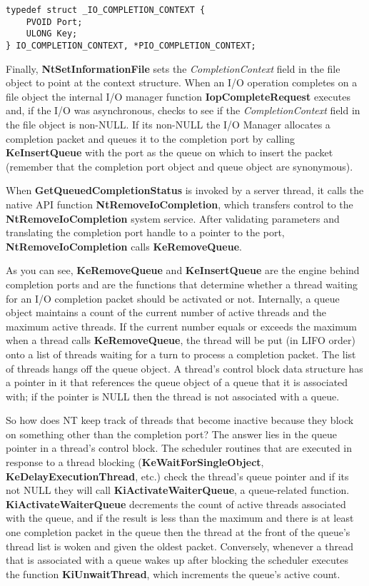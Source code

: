 \documentclass[a4paper,12pt,notitlepage,twoside,openright]{article}
\begin{document}
\begin{verbatim}
typedef struct _IO_COMPLETION_CONTEXT {
    PVOID Port;
    ULONG Key;
} IO_COMPLETION_CONTEXT, *PIO_COMPLETION_CONTEXT;
\end{verbatim}

Finally, \textbf{NtSetInformationFile} sets the \emph{CompletionContext} field in the file object to point at the context structure. When an I/O operation completes on a file object the internal I/O manager function \textbf{IopCompleteRequest} executes and, if the I/O was asynchronous, checks to see if the \emph{CompletionContext} field in the file object is non-NULL. If its non-NULL the I/O Manager allocates a completion packet and queues it to the completion port by calling \textbf{KeInsertQueue} with the port as the queue on which to insert the packet (remember that the completion port object and queue object are synonymous).

When \textbf{GetQueuedCompletionStatus} is invoked by a server thread, it calls the native API function \textbf{NtRemoveIoCompletion}, which transfers control to the \textbf{NtRemoveIoCompletion} system service. After validating parameters and translating the completion port handle to a pointer to the port, \textbf{NtRemoveIoCompletion} calls \textbf{KeRemoveQueue}.

As you can see, \textbf{KeRemoveQueue} and \textbf{KeInsertQueue} are the engine behind completion ports and are the functions that determine whether a thread waiting for an I/O completion packet should be activated or not. Internally, a queue object maintains a count of the current number of active threads and the maximum active threads. If the current number equals or exceeds the maximum when a thread calls \textbf{KeRemoveQueue}, the thread will be put (in LIFO order) onto a list of threads waiting for a turn to process a completion packet. The list of threads hangs off the queue object. A thread's control block data structure has a pointer in it that references the queue object of a queue that it is associated with; if the pointer is NULL then the thread is not associated with a queue.

So how does NT keep track of threads that become inactive because they block on something other than the completion port? The answer lies in the queue pointer in a thread's control block. The scheduler routines that are executed in response to a thread blocking (\textbf{KeWaitForSingleObject}, \textbf{KeDelayExecutionThread}, etc.) check the thread's queue pointer and if its not NULL they will call \textbf{KiActivateWaiterQueue}, a queue-related function. \textbf{KiActivateWaiterQueue} decrements the count of active threads associated with the queue, and if the result is less than the maximum and there is at least one completion packet in the queue then the thread at the front of the queue's thread list is woken and given the oldest packet. Conversely, whenever a thread that is associated with a queue wakes up after blocking the scheduler executes the function \textbf{KiUnwaitThread}, which increments the queue's active count.
\end{document}
